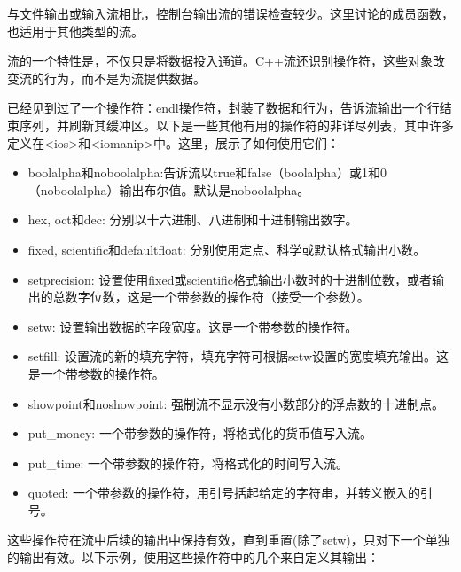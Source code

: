 与文件输出或输入流相比，控制台输出流的错误检查较少。这里讨论的成员函数，也适用于其他类型的流。


流的一个特性是，不仅只是将数据投入通道。C++流还识别操作符，这些对象改变流的行为，而不是为流提供数据。

已经见到过了一个操作符：endl操作符，封装了数据和行为，告诉流输出一个行结束序列，并刷新其缓冲区。以下是一些其他有用的操作符的非详尽列表，其中许多定义在<ios>和<iomanip>中。这里，展示了如何使用它们：

\begin{itemize}
\item
boolalpha和noboolalpha:告诉流以true和false（boolalpha）或1和0（noboolalpha）输出布尔值。默认是noboolalpha。

\item
hex, oct和dec: 分别以十六进制、八进制和十进制输出数字。

\item
fixed, scientific和defaultfloat: 分别使用定点、科学或默认格式输出小数。

\item
setprecision: 设置使用fixed或scientific格式输出小数时的十进制位数，或者输出的总数字位数，这是一个带参数的操作符（接受一个参数）。

\item
setw: 设置输出数据的字段宽度。这是一个带参数的操作符。

\item
setfill: 设置流的新的填充字符，填充字符可根据setw设置的宽度填充输出。这是一个带参数的操作符。

\item
showpoint和noshowpoint: 强制流不显示没有小数部分的浮点数的十进制点。

\item
put\_money: 一个带参数的操作符，将格式化的货币值写入流。

\item
put\_time: 一个带参数的操作符，将格式化的时间写入流。

\item
quoted: 一个带参数的操作符，用引号括起给定的字符串，并转义嵌入的引号。
\end{itemize}

这些操作符在流中后续的输出中保持有效，直到重置(除了setw)，只对下一个单独的输出有效。以下示例，使用这些操作符中的几个来自定义其输出：

